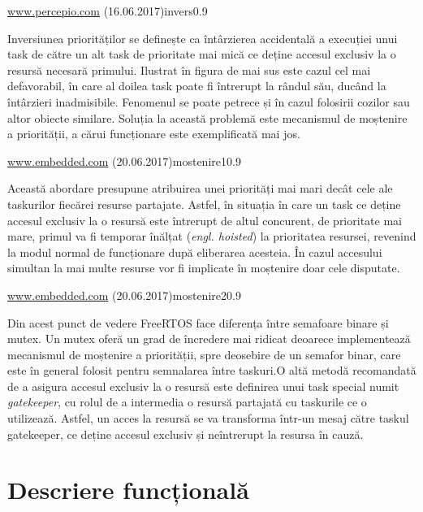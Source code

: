 {\href{https://percepio.com/wp-content/uploads/2016/03/1.-priority-inversion.png}
{www.percepio.com} (16.06.2017)}{invers}{0.9}

Inversiunea priorităților se definește ca întârzierea accidentală a execuției unui task de către un alt task de prioritate mai mică ce deține accesul \mbox{exclusiv} la o resursă necesară primului. Ilustrat în figura de mai sus este cazul cel mai \mbox{defavorabil}, în care al doilea task poate fi întrerupt la rândul său, ducând la întârzieri \mbox{inadmisibile}. Fenomenul se poate petrece și în cazul folosirii cozilor sau altor obiecte similare. Soluția la această problemă este mecanismul de moștenire a priorității, a cărui funcționare este exemplificată mai jos.

{\href{http://m.eet.com/media/1075483/0406feat3fig5.gif}
{www.embedded.com} (20.06.2017)}{mostenire1}{0.9}

Această abordare presupune atribuirea unei priorități mai mari decât cele ale taskurilor fiecărei resurse partajate. Astfel, în situația în care un task ce deține accesul exclusiv la o resursă este întrerupt de altul concurent, de prioritate mai mare, primul va fi temporar înălțat (\textit{engl. hoisted}) la prioritatea resursei, revenind la modul normal de funcționare după eliberarea acesteia. În cazul accesului simultan la mai multe resurse vor fi implicate în moștenire doar cele disputate.

{\href{http://m.eet.com/media/1075486/0406feat3fig8.gif}
{www.embedded.com} (20.06.2017)}{mostenire2}{0.9}

Din acest punct de vedere FreeRTOS face diferența între semafoare binare și mutex. Un mutex oferă un grad de încredere mai ridicat deoarece implementează mecanismul de moștenire a priorității, spre deosebire de un semafor binar, care este în general folosit pentru semnalarea între taskuri.O altă metodă recomandată de a asigura accesul exclusiv la o resursă este definirea unui task special numit \textit{gatekeeper}, cu rolul de a intermedia o resursă partajată cu taskurile ce o utilizează. Astfel, un acces la resursă se va transforma într-un mesaj către taskul gatekeeper, ce deține accesul exclusiv și neîntrerupt la resursa în cauză. \cite{freertos2}


\section{Descriere funcțională}


